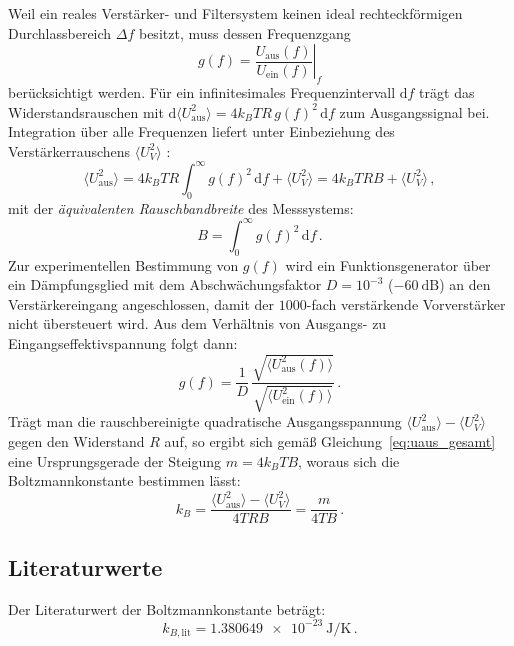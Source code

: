 \documentclass[12pt,a4paper,titlepage]{scrartcl}
\numberwithin{equation}{section}
\numberwithin{table}{section}
\numberwithin{figure}{section}
\begin{document}
Weil ein reales Verstärker- und Filtersystem keinen ideal rechteckförmigen Durchlassbereich $\Delta f$ besitzt, muss dessen Frequenzgang
\begin{equation}
    g(f) = \left.\frac{U_{\text{aus}}(f)}{U_{\text{ein}}(f)}\right|_f
    \label{eq:frequenzgang_def}
\end{equation}
berücksichtigt werden. Für ein infinitesimales Frequenzintervall $\mathrm{d}f$ trägt das Widerstandsrauschen mit $\mathrm{d}\langle U_{\text{aus}}^2 \rangle = 4 k_B T R\, g(f)^2\,\mathrm{d}f$ zum Ausgangssignal bei. Integration über alle Frequenzen liefert unter Einbeziehung des Verstärkerrauschens $\langle U_V^2 \rangle$ \cite{PAPskript}:
\begin{equation}
    \langle U_{\text{aus}}^2 \rangle = 4 k_B T R \int_{0}^{\infty} g(f)^2\,\mathrm{d}f + \langle U_V^2 \rangle = 4 k_B T R B + \langle U_V^2 \rangle \,,
    \label{eq:uaus_gesamt}
\end{equation}
mit der \emph{äquivalenten Rauschbandbreite} des Messsystems:
\begin{equation}
    B = \int_{0}^{\infty} g(f)^2\,\mathrm{d}f \,.
    \label{eq:rauschbandbreite}
\end{equation}
Zur experimentellen Bestimmung von $g(f)$ wird ein Funktionsgenerator über ein Dämpfungsglied mit dem Abschwächungsfaktor $D = 10^{-3}$ ($\SI{-60}{\deci\bel}$) an den Verstärkereingang angeschlossen, damit der $\num{1000}$-fach verstärkende Vorverstärker nicht übersteuert wird. Aus dem Verhältnis von Ausgangs- zu Eingangseffektivspannung folgt dann:
\begin{equation}
    g(f) = \frac{1}{D}\,\frac{\sqrt{\langle U_{\text{aus}}^2(f) \rangle}}{\sqrt{\langle U_{\text{ein}}^2(f) \rangle}} \,.
    \label{eq:gf_mess}
\end{equation}
Trägt man die rauschbereinigte quadratische Ausgangsspannung $\langle U_{\text{aus}}^2 \rangle - \langle U_V^2 \rangle$ gegen den Widerstand $R$ auf, so ergibt sich gemäß Gleichung~\eqref{eq:uaus_gesamt} eine Ursprungsgerade der Steigung $m = 4 k_B T B$, woraus sich die Boltzmannkonstante bestimmen lässt:
\begin{equation}
    k_B = \frac{\langle U_{\text{aus}}^2 \rangle - \langle U_V^2 \rangle}{4 T R B} = \frac{m}{4 T B} \,.
    \label{eq:boltzmann}
\end{equation}

\subsection{Literaturwerte}
Der Literaturwert der Boltzmannkonstante beträgt:
\begin{equation*}
    k_{B,\text{lit}} = \SI{1.380649e-23}{\joule\per\kelvin} \,.
\end{equation*}
\end{document}
